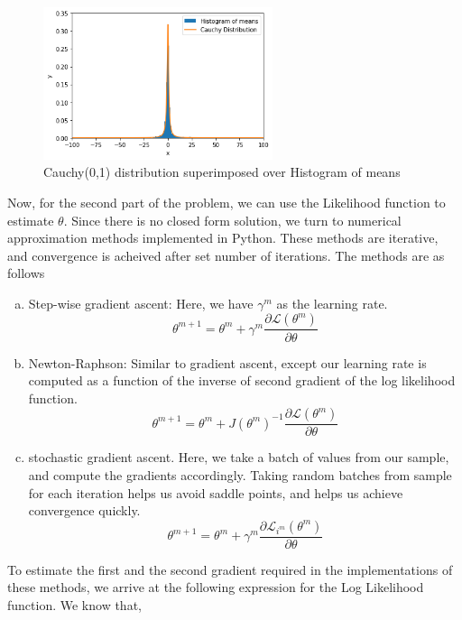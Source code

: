 \documentclass[11pt]{article}
\begin{document}
\begin{figure}[H]
  \centering
  \includegraphics[width = 0.6\textwidth]{q3.png}
  \caption{Cauchy(0,1) distribution superimposed over Histogram of means}
\end{figure}
\noindent Now, for the second part of the problem, we can use the Likelihood function to estimate $\theta$. Since there is no closed form solution, we turn to numerical approximation methods implemented in Python. These methods are iterative, and convergence is acheived after set number of iterations. The methods are as follows
\begin{enumerate}[a.]
  \item Step-wise gradient ascent: Here, we have $\gamma^{m}$ as the learning rate.
  \begin{equation}
    \nonumber
    \theta^{m+1} = \theta^{m} + \gamma^{m}\frac{\partial \mathcal{L}(\theta^{m})}{\partial \theta}
  \end{equation}
  \item Newton-Raphson: Similar to gradient ascent, except our learning rate is computed as a function of the inverse of second gradient of the log likelihood function.
  \begin{equation}
    \nonumber
    \theta^{m+1} = \theta^{m} + J(\theta^{m})^{-1}\frac{\partial \mathcal{L}(\theta^{m})}{\partial \theta}
  \end{equation}
  \item stochastic gradient ascent.
  Here, we take a batch of values from our sample, and compute the gradients accordingly. Taking random batches from sample for each iteration helps us avoid saddle points, and helps us achieve convergence quickly.
  \begin{equation}
    \nonumber
    \theta^{m+1} = \theta^{m} + \gamma^{m}\frac{\partial \mathcal{L}_{i^{m}}(\theta^{m})}{\partial \theta}
  \end{equation}
\end{enumerate}
To estimate the first and the second gradient required in the implementations of these methods, we arrive at the following expression for the Log Likelihood function. We know that,
\end{document}
